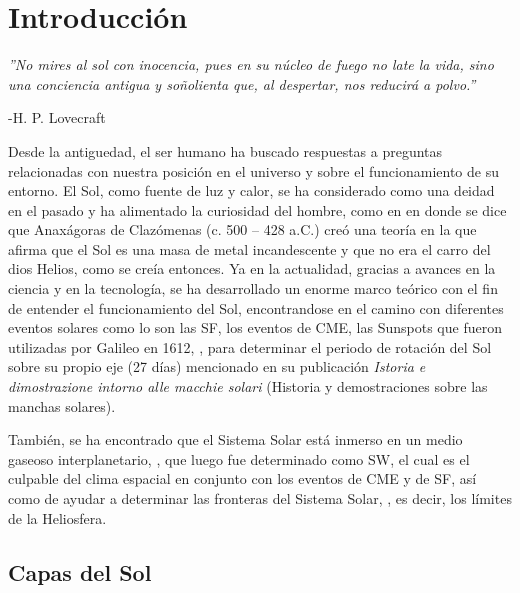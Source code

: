 \chapter{Introducción} 


\begin{flushright}
\textit{''No mires al sol con inocencia, pues en su núcleo de fuego no late la vida, sino una conciencia antigua y soñolienta que, al despertar, nos reducirá a polvo.''}

-H. P. Lovecraft
\end{flushright}

Desde la antiguedad, el ser humano ha buscado respuestas a preguntas relacionadas con nuestra posición en el universo y sobre el funcionamiento de su entorno. El Sol, como fuente de luz y calor, se ha considerado como una deidad en el pasado y ha alimentado la curiosidad del hombre, como en \cite[e.g.,]{2010anaxagoras} en donde se dice que Anaxágoras de Clazómenas (c. 500 – 428 a.C.) creó una teoría en la que afirma que el Sol es una masa de metal incandescente y que no era el carro del dios Helios, como se creía entonces. Ya en la actualidad, gracias a avances en la ciencia y en la tecnología, se ha desarrollado un enorme marco teórico con el fin de entender el funcionamiento del Sol, encontrandose en el camino con diferentes eventos solares como lo son las \ac{SF}, los eventos de \ac{CME}, las \ac{Sunspots} que fueron utilizadas por Galileo en 1612, \cite[e.g.,]{vaquero-2009}, para determinar el periodo de rotación del Sol sobre su propio eje (27 días) mencionado en su publicación \textit{Istoria e dimostrazione intorno alle macchie solari} (Historia y demostraciones sobre las manchas solares). 

También, se ha encontrado que el Sistema Solar está inmerso en un medio gaseoso interplanetario, \cite{1951ZA.....29..274B, parker-1958}, que luego fue determinado como \ac{SW}, el cual es el culpable del clima espacial en conjunto con los eventos de \ac{CME} y de \ac{SF}, así como de ayudar a determinar las fronteras del Sistema Solar, \cite{stone-2013}, es decir, los límites de la Heliosfera.

\section{Capas del Sol}



